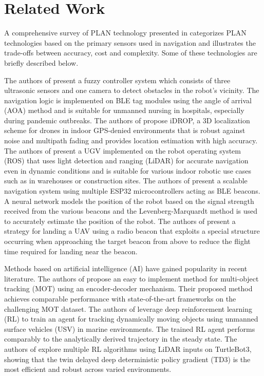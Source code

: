 \documentclass[conference]{IEEEtran}
\begin{document}
\section{Related Work}
\label{sec:related-work}

A comprehensive survey of PLAN technology presented in
\cite{el-sheimyIndoorNavigationState2021} categorizes PLAN technologies based on
the primary sensors used in navigation and illustrates the trade-offs between
accuracy, cost and complexity. Some of these technologies are briefly described
below.

The authors of \cite{narayananFuzzyGuidedAutonomous2022} present a fuzzy
controller system which consists of three ultrasonic sensors and one camera to
detect obstacles in the robot's vicinity. The navigation logic is implemented on
BLE tag modules using the angle of arrival (AOA) method and is suitable for
unmanned nursing in hospitals, especially during pandemic outbreaks. The authors
of \cite{familiIDROPRobustLocalization2023} propose iDROP, a 3D localization
scheme for drones in indoor GPS-denied environments that is robust against noise
and multipath fading and provides location estimation with high accuracy. The
authors of \cite{htROSPoweredAutonomous2024} present a UGV implemented on the
robot operating system (ROS) that uses light detection and ranging (LiDAR) for
accurate navigation even in dynamic conditions and is suitable for various
indoor robotic use cases such as in warehouses or construction sites. The
authors of \cite{yukhimetsLocalNavigationSystem2024} present a scalable
navigation system using multiple ESP32 microcontrollers acting as BLE beacons. A
neural network models the position of the robot based on the signal strength
received from the various beacons and the Levenberg-Marquardt method is used to
accurately estimate the position of the robot. The authors of
\cite{stefasUAVLandingUnknown2019} present a strategy for landing a UAV using a
radio beacon that exploits a special structure occurring when approaching the
target beacon from above to reduce the flight time required for landing near the
beacon.

Methods based on artificial intelligence (AI) have gained popularity in recent
literature. The authors of \cite{liuSimpleOnlineUnmanned2021} propose an easy to
implement method for multi-object tracking (MOT) using an encoder-decoder
mechanism. Their proposed method achieves comparable performance with
state-of-the-art frameworks on the challenging MOT dataset. The authors of
\cite{masmitjaReinforcementLearningPath2022} leverage deep reinforcement
learning (RL) to train an agent for tracking dynamically moving objects using
unmanned surface vehicles (USV) in marine environments. The trained RL agent
performs comparably to the analytically derived trajectory in the steady state.
The authors of \cite{kashyapAutonomousNavigationROS22025} explore multiple RL
algorithms using LiDAR inputs on TurtleBot3, showing that the twin delayed deep
deterministic policy gradient (TD3) is the most efficient and robust across
varied environments.
\end{document}
